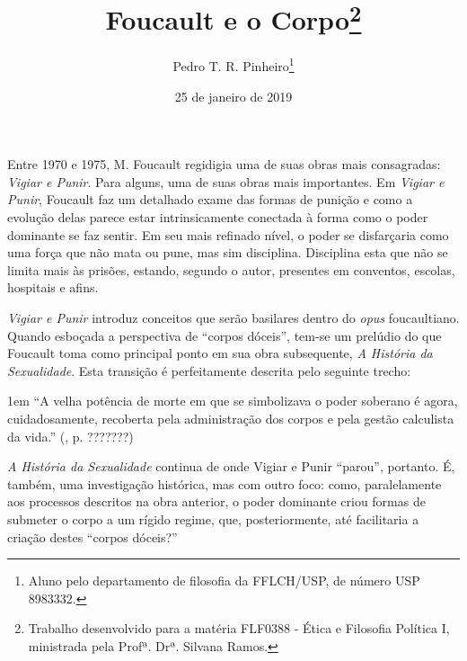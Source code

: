 \documentclass[12pt,a4paper]{article}
\author{Pedro T. R. Pinheiro\footnote{Aluno pelo departamento de filosofia 
da FFLCH/USP, de número USP 8983332. }}
\title{Foucault e o Corpo\footnote{
	Trabalho desenvolvido para a matéria FLF0388 - Ética e Filosofia 
	Política I, ministrada pela Profª. Drª. Silvana Ramos. }}
\date{25 de janeiro de 2019}
\newenvironment{citac}
{
	\begin{addmargin}
		[4cm]{1em} \footnotesize}{\normalfont 
	\end{addmargin}
}
\begin{document}
	\maketitle
	
	\onehalfspacing
	\setlength{\parskip}{0.5cm}
	
	Entre 1970 e 1975, M. Foucault regidigia uma de suas obras mais 
	consagradas: \textit{Vigiar e Punir}. Para alguns, uma de suas 
	obras mais importantes. Em \textit{Vigiar e Punir}, Foucault faz 
	um detalhado exame das formas de punição e como a evolução delas 
	parece estar intrinsicamente conectada à forma como o poder dominante 
	se faz sentir. Em seu mais refinado nível, o poder se disfarçaria 
	como uma força que não mata ou pune, mas sim disciplina. Disciplina 
	esta que não se limita mais às prisões, estando, segundo o autor, 
	presentes em conventos, escolas, hospitais e afins. 
	
	\textit{Vigiar e Punir} introduz conceitos que serão basilares 
	dentro do \textit{opus} foucaultiano. Quando esboçada a perspectiva 
	de ``corpos dóceis'', tem-se um prelúdio do que Foucault toma como 
	principal ponto em sua obra subsequente, \textit{A História da 
	Sexualidade}. Esta transição é perfeitamente descrita pelo seguinte 
	trecho: 
	
	\begin{citac}
	“A velha potência de morte em que se simbolizava o poder soberano 
	é agora, cuidadosamente, recoberta pela administração dos corpos e pela 
	gestão calculista da vida.” (\cite{hs}, p. ???????)
	\end{citac}
	
	\textit{A História da Sexualidade} continua de onde {Vigiar e Punir} 
	``parou'', portanto. É, também, uma investigação histórica, mas com 
	outro foco: como, paralelamente aos processos descritos na obra anterior, 
	o poder dominante criou formas de submeter o corpo a um rígido regime, 
	que, posteriormente, até facilitaria a criação destes ``corpos dóceis?''


	
	
\end{document}
